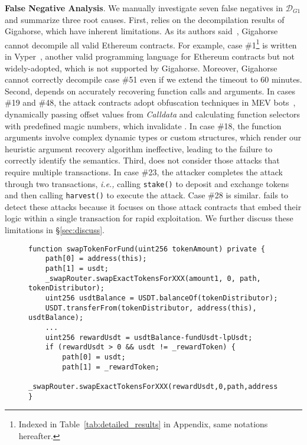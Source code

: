 \noindent \textbf{False Negative Analysis}.
We manually investigate seven false negatives in $\mathcal{D}_{G1}$ and summarize three root causes.
First, {\tool} relies on the decompilation results of Gigahorse, which have inherent limitations. As its authors said~\cite{grech2019gigahorse}, Gigahorse cannot decompile all valid Ethereum contracts. For example, case \#1\footnote{Indexed in Table~\ref{tab:detailed_results} in Appendix, same notations hereafter.} is written in Vyper~\cite{vyper}, another valid programming language for Ethereum contracts but not widely-adopted, which is not supported by Gigahorse.
Moreover, Gigahorse cannot correctly decompile case \#51 even if we extend the timeout to 60 minutes.
Second, {\tool} depends on accurately recovering function calls and arguments. In cases \#19 and \#48, the attack contracts adopt obfuscation techniques in MEV bots~\cite{mevObfus}, dynamically passing offset values from \textit{Calldata} and calculating function selectors with predefined magic numbers, which invalidate {\tool}. 
In case \#18, the function arguments involve complex dynamic types or custom structures, which render our heuristic argument recovery algorithm ineffective, leading to the failure to correctly identify the semantics.
Third, {\tool} does not consider those attacks that require multiple transactions. In case \#23, the attacker completes the attack through two transactions, \textit{i.e.,} calling \texttt{stake()} to deposit and exchange tokens and then calling \texttt{harvest()} to execute the attack. Case \#28 is similar. {\tool} fails to detect these attacks because it focuses on those attack contracts that embed their logic within a single transaction for rapid exploitation.
We further discuss these limitations in \S\ref{sec:discuss}.

\begin{figure}[h]
\begin{lstlisting}[caption={The \texttt{swapTokenForFund()} function.}, label=lst:fpcode, belowskip=-2em]
function swapTokenForFund(uint256 tokenAmount) private {
    path[0] = address(this);
    path[1] = usdt;
    _swapRouter.swapExactTokensForXXX(amount1, 0, path, tokenDistributor);
    uint256 usdtBalance = USDT.balanceOf(tokenDistributor);
    USDT.transferFrom(tokenDistributor, address(this), usdtBalance);
    ...
    uint256 rewardUsdt = usdtBalance-fundUsdt-lpUsdt;
    if (rewardUsdt > 0 && usdt != _rewardToken) {
        path[0] = usdt;
        path[1] = _rewardToken;
        _swapRouter.swapExactTokensForXXX(rewardUsdt,0,path,address(this));}
}

\end{lstlisting}
\end{figure}

